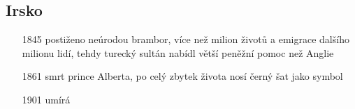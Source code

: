 \documentclass{article}
\begin{document}
\subsection*{Irsko}
\begin{itemize}
    \vspace{-0.5em}
    \setlength\itemsep{0.15em}
    \item[1845] postiženo neúrodou brambor, více než milion životů a emigrace dalšího milionu lidí, tehdy turecký sultán nabídl větší peněžní pomoc než Anglie
\end{itemize}

\begin{itemize}
    \vspace{-0.5em}
    \setlength\itemsep{0.15em}
    \item[1861] smrt prince Alberta, po celý zbytek života nosí černý šat jako symbol
    \item[1901] umírá
\end{itemize}
\end{document}
